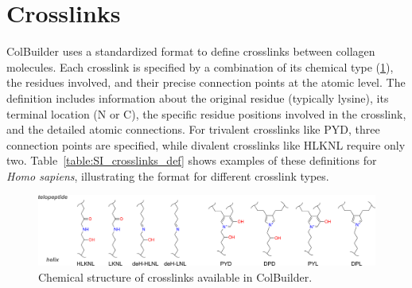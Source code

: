 \documentclass[10pt,letterpaper]{article}
\begin{document}
\section*{Crosslinks}

ColBuilder uses a standardized format to define crosslinks between collagen molecules. Each crosslink is specified by a combination of its chemical type (\ref{fig:SI_crosslinks}), the residues involved, and their precise connection points at the atomic level. The definition includes information about the original residue (typically lysine), its terminal location (N or C), the specific residue positions involved in the crosslink, and the detailed atomic connections. For trivalent crosslinks like PYD, three connection points are specified, while divalent crosslinks like HLKNL require only two. Table~\ref{table:SI_crosslinks_def} shows examples of these definitions for \textit{Homo sapiens}, illustrating the format for different crosslink types.

\begin{figure}[h]
    \centering
    \includegraphics[width=\textwidth]{figures/crosslinks-structures.png}
    \caption{Chemical structure of crosslinks available in ColBuilder.}
    \label{fig:SI_crosslinks}
\end{figure}
\end{document}
